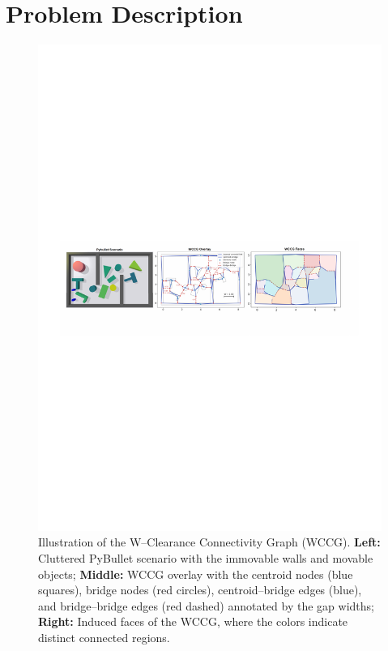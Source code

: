\section{Problem Description}\label{sec:problem}
\begin{figure}[t!]
  \centering
  \includegraphics[width=\linewidth]{figures/wccg.pdf}
  \vspace{-0.2in}
  \caption{Illustration of the W--Clearance Connectivity Graph (WCCG).
\textbf{Left:} Cluttered PyBullet scenario with the immovable walls and movable objects;
\textbf{Middle:} WCCG overlay with the centroid nodes (blue squares), bridge nodes
(red circles), centroid--bridge edges (blue), and bridge--bridge edges (red dashed)
annotated by the gap widths;
\textbf{Right:} Induced faces of the WCCG, where the colors indicate distinct connected
regions.}
  \label{fig:wccg}
  \vspace{-0.2in}
\end{figure}
